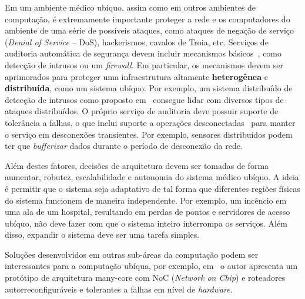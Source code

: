 Em um ambiente médico ubíquo, assim como em outros ambientes de computação, é extremamente importante proteger a rede e os computadores do ambiente de uma série de possíveis ataques, como ataques de negação de serviço (\emph{Denial of Service} -- DoS), hackerismos, cavalos de Troia, etc. Serviços de auditoria automática de segurança devem incluir mecanismos básicos~\cite{lunt1988automated,tsudik1990audes}, como detecção de intrusos ou um \emph{firewall}. Em particular, os mecanismos devem ser aprimorados para proteger uma infraestrutura altamente \textbf{heterogênea} e \textbf{distribuída}, como um sistema ubíquo. Por exemplo, um sistema distribuído de detecção de intrusos como proposto em~\cite{bass2000intrusion} consegue lidar com diversos tipos de ataques distribuídos. O próprio serviço de auditoria deve possuir suporte de tolerância a falhas, o que inclui suporte a operações desconectadas~\cite{kistler1992disconnected} para manter o serviço em desconexões transientes. Por exemplo, sensores distribuídos podem ter que \emph{bufferizar} dados durante o período de desconexão da rede.

Além destes fatores, decisões de arquitetura devem ser tomadas de forma aumentar, robutez, escalabilidade e autonomia do sistema médico ubíquo. A ideia é permitir que o sistema seja adaptativo de tal forma que diferentes regiões físicas do sistema funcionem de maneira independente. Por exemplo, um incêncio em uma ala de um hospital, resultando em perdas de pontos e servidores de acesso ubíquo, não deve fazer com que o sistema inteiro interrompa os serviços. Além disso, expandir o sistema deve ser uma tarefa simples.


Soluções desenvolvidos em outras sub-áreas da computação podem ser interessantes para a computação ubíqua, por exemplo, em~\cite{parikhformally} o autor apresenta um protótipo de arquitetura many-core com NoC (\emph{Network on Chip}) e roteadores autorreconfiguráveis e tolerantes a falhas em nível de \emph{hardware}.

